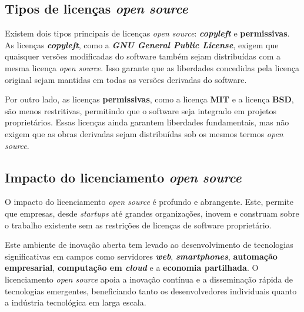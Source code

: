\subsection{Tipos de licenças \textit{open source}}
Existem dois tipos principais de licenças \textit{open source}: \textbf{\textit{copyleft}} e \textbf{permissivas}. As licenças \textbf{\textit{copyleft}}, como a \textbf{\textit{GNU General Public License}}, exigem que quaisquer versões
modificadas do software também sejam distribuídas com a mesma licença \textit{open source}. Isso garante que as liberdades concedidas pela licença original sejam mantidas em todas as versões derivadas do software. 
\par \vspace{6pt}
Por outro lado, as licenças \textbf{permissivas}, como a licença \textbf{MIT} e a licença \textbf{BSD}, são menos restritivas, permitindo que o software seja integrado em projetos proprietários. 
Essas licenças ainda garantem liberdades fundamentais, mas não exigem que as obras derivadas sejam distribuídas sob os mesmos termos \textit{open source}.

\subsection{Impacto do licenciamento \textit{open source}}
O impacto do licenciamento \textit{open source} é profundo e abrangente. Este, permite que empresas, desde \textit{startups} até grandes organizações, inovem e construam sobre o trabalho existente sem as 
restrições de licenças de software proprietário.
\par \vspace{6pt}
Este ambiente de inovação aberta tem levado ao desenvolvimento de tecnologias significativas em campos como servidores \textbf{\textit{web}}, \textbf{\textit{smartphones}}, \textbf{automação empresarial}, \textbf{computação em \textit{cloud}} e a \textbf{economia partilhada}. 
O licenciamento \textit{open source} apoia a inovação contínua e a disseminação rápida de tecnologias emergentes, beneficiando tanto os desenvolvedores individuais quanto a indústria tecnológica em larga escala.
